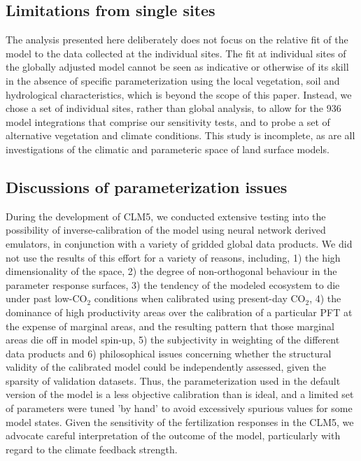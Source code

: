 \documentclass[draft,linenumbers]{agujournal}
\begin{document}
\subsection{Limitations from single sites}
The analysis presented here deliberately does not focus on the relative fit of the model to the data collected at the individual sites. The fit at individual sites of the globally adjusted model cannot be seen as indicative or otherwise of its skill in the absence of specific parameterization using the local vegetation, soil and hydrological characteristics, which is beyond the scope of this paper. Instead, we chose a set of individual sites, rather than global analysis, to allow for the 936 model integrations that comprise our sensitivity tests, and to probe a set of alternative vegetation and climate conditions. This study is incomplete, as are all investigations of the climatic and parameteric space of land surface models. 


\subsection{Discussions of parameterization issues}
During the development of CLM5, we conducted extensive testing into the possibility of inverse-calibration of the model using neural network derived emulators, in conjunction with a variety of gridded global data products. We did not use the results of this effort for a variety of reasons, including,  1) the high dimensionality of the space, 2) the degree of non-orthogonal behaviour in the parameter response surfaces,  3) the tendency of the modeled ecosystem to die under past low-CO$_{2}$ conditions when calibrated using present-day CO$_{2}$, 4) the dominance of high productivity areas over the calibration of a particular PFT at the expense of marginal areas, and the resulting pattern that those marginal areas die off in model spin-up, 5) the subjectivity in weighting of the different data products and 6) philosophical issues concerning whether the structural validity of the calibrated model could be independently assessed, given the sparsity of validation datasets. Thus, the parameterization used in the default version of the model is a less objective calibration than is ideal, and a limited set of parameters were tuned 'by hand' to avoid excessively spurious values for some model states.  Given the sensitivity of the fertilization responses in the CLM5, we advocate careful interpretation of the outcome of the model, particularly with regard to the climate feedback strength.
\end{document}
